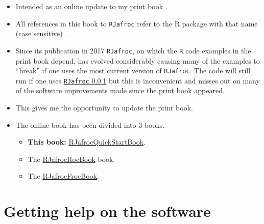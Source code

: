 \documentclass[
]{book}
\providecommand{\tightlist}{%
  \setlength{\itemsep}{0pt}\setlength{\parskip}{0pt}}
\begin{document}
\begin{itemize}
\tightlist
\item
  Intended as an online update to my print book \citep{chakraborty2017observer}.
\item
  All references in this book to \texttt{RJafroc} refer to the R package with that name (case sensitive) \citep{R-RJafroc}.
\item
  Since its publication in 2017 \texttt{RJafroc}, on which the \texttt{R} code examples in the print book depend, has evolved considerably causing many of the examples to ``break'' if one uses the most current version of \texttt{RJafroc}. The code will still run if one uses \href{https://cran.r-project.org/src/contrib/Archive/RJafroc/}{\texttt{RJafroc} 0.0.1} but this is inconvenient and misses out on many of the software improvements made since the print book appeared.
\item
  This gives me the opportunity to update the print book.
\item
  The online book has been divided into 3 books.

  \begin{itemize}
  \tightlist
  \item
    \textbf{This book:} \href{https://dpc10ster.github.io/RJafrocQuickStart/}{RJafrocQuickStartBook}.
  \item
    The \href{https://dpc10ster.github.io/RJafrocRocBook/}{RJafrocRocBook} book.
  \item
    The \href{https://dpc10ster.github.io/RJafrocFrocBook/}{RJafrocFrocBook}.
  \end{itemize}
\end{itemize}

\hypertarget{quick-start-index-getting-help}{%
\section{Getting help on the software}\label{quick-start-index-getting-help}}
\end{document}
